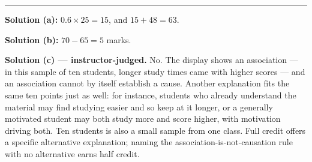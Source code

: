 \documentclass[12pt]{article}
\begin{document}
\vspace{0.15cm}\noindent\rule{\linewidth}{0.2pt}


\textbf{Solution (a):} \quad $0.6 \times 25 = 15$, and $15 + 48 = 63$. 

\noindent\textbf{Solution (b):} \quad $70 - 65 = 5$ marks. 

\noindent\textbf{Solution (c) --- instructor-judged.} No. The display shows an association --- in
this sample of ten students, longer study times came with higher scores --- and an association
cannot by itself establish a cause. Another explanation fits the same ten points just as well: for
instance, students who already understand the material may find studying easier and so keep at it
longer, or a generally motivated student may both study more and score higher, with motivation
driving both. Ten students is also a small sample from one class. Full credit offers a specific
alternative explanation; naming the association-is-not-causation rule with no alternative earns
half credit.
\end{document}
